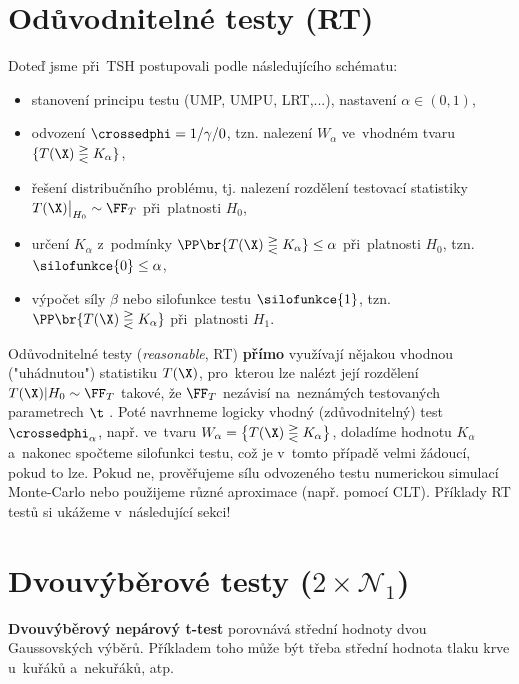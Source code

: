 \section{Odůvodnitelné testy (RT)}
Doteď jsme při~TSH postupovali podle následujícího schématu:\begin{itemize}
	\item stanovení principu testu (UMP, UMPU, LRT,...), nastavení $\alpha\in(0,1)$,
	\item odvození $\crossedphi=1/\gamma/0$, tzn. nalezení $W_\alpha$ ve~vhodném tvaru $\{ T(\X)\gtreqless K_\alpha \}$,
	\item řešení distribučního problému, tj. nalezení rozdělení testovací statistiky $T(\X)\big|_{H_0}\sim\FF_T$ při~platnosti $H_0$,
	\item určení $K_\alpha$ z~podmínky $\PP\br{T(\X)\gtreqless K_\alpha}\leq \alpha$ při~platnosti $H_0$, tzn. $\silofunkce{0}\leq \alpha$,
	\item výpočet síly $\beta$ nebo silofunkce testu $\silofunkce{1}$, tzn. $\PP\br{T(\X)\gtreqless K_\alpha}$ při~platnosti $H_1$.
\end{itemize}
Odůvodnitelné testy (\textit{reasonable}, RT) \textbf{přímo} využívají nějakou vhodnou ("uhádnutou") statistiku $T(\X)$, pro~kterou lze nalézt její rozdělení $T(\X)|H_0\sim\FF_T$ takové, že $\FF_T$ nezávisí na~neznámých testovaných parametrech $\t$ . Poté navrhneme logicky vhodný (zdůvodnitelný) test $\crossedphi_\alpha$, např. ve~tvaru $W_\alpha=\left\{ T(\X)\gtreqless K_\alpha \right\}$, doladíme hodnotu $K_\alpha$ a~nakonec spočteme silofunkci testu, což je v~tomto případě velmi žádoucí, pokud to lze. Pokud ne, prověřujeme sílu odvozeného testu numerickou simulací Monte-Carlo nebo použijeme různé aproximace (např. pomocí CLT). Příklady RT testů si ukážeme v~následující sekci!

\section{Dvouvýběrové testy ($2\times\mathcal{N}_1$)}
\textbf{Dvouvýběrový nepárový t-test} porovnává střední hodnoty dvou Gaussovských výběrů. Příkladem toho může být třeba střední hodnota tlaku krve u~kuřáků a~nekuřáků, atp. 

